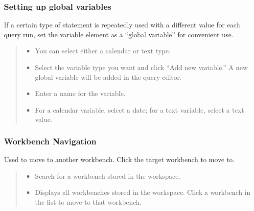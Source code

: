 \documentclass[letterpaper,10pt,english]{sphinxmanual}
\begin{document}
\subsubsection{Setting up global variables}
\label{\detokenize{discovery/part06/06_03-use_a_workbench:global-variable}}\label{\detokenize{discovery/part06/06_03-use_a_workbench:id9}}
If a certain type of statement is repeatedly used with a different value for each query run, set the variable element as a “global variable” for convenient use.
\begin{quote}

\begin{figure}[H]
\centering

\noindent{}
\end{figure}
\begin{itemize}
\item {} 
 You can select either a calendar or text type.

\item {} 
 Select the variable type you want and click “Add new variable.” A new global variable will be added in the query editor.

\item {} 
 Enter a name for the variable.

\item {} 
 For a calendar variable, select a date; for a text variable, select a text value.

\end{itemize}
\end{quote}


\subsubsection{Workbench Navigation}
\label{\detokenize{discovery/part06/06_03-use_a_workbench:workbench-navigation}}\label{\detokenize{discovery/part06/06_03-use_a_workbench:id10}}
Used to move to another workbench. Click the target workbench to move to.
\begin{quote}

\begin{figure}[H]
\centering

\noindent{}
\end{figure}
\begin{itemize}
\item {} 
 Search for a workbench stored in the workspace.

\item {} 
 Displays all workbenches stored in the workspace. Click a workbench in the list to move to that workbench.

\end{itemize}
\end{quote}
\end{document}
